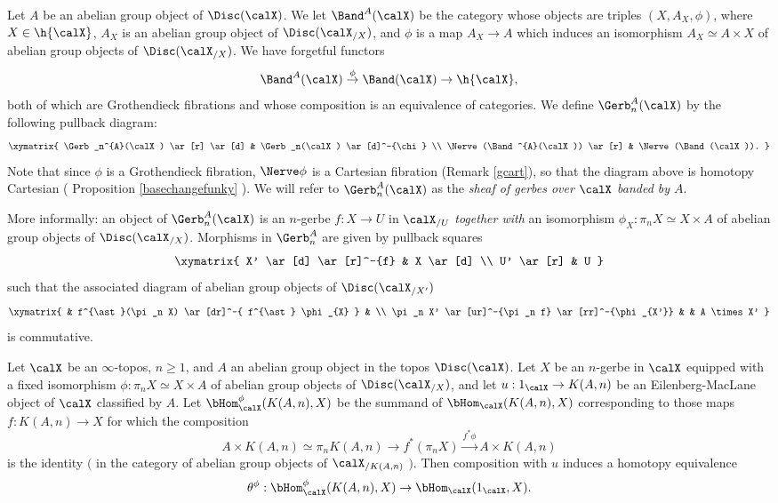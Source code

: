 \begin{notation}
Let $A$ be an abelian group object of $\Disc( \calX)$. We let $\Band^{A}(\calX)$
be the category whose objects are triples $(X, A_{X}, \phi)$, where $X \in \h{\calX}$,
$A_{X}$ is an abelian group object of $\Disc( \calX_{/X})$, and $\phi$ is a map
$A_{X} \rightarrow A$ which induces an isomorphism $A_{X} \simeq A \times X$ of abelian
group objects of $\Disc( \calX_{/X})$. We have forgetful functors
$$ \Band^{A}(\calX) \stackrel{\phi}{\rightarrow} \Band(\calX) \rightarrow \h{\calX},$$
both of which are Grothendieck fibrations and whose composition is an equivalence of categories.
We define $\Gerb^{A}_n(\calX)$ by the following pullback diagram:
$$ \xymatrix{ \Gerb_n^{A}(\calX) \ar[r] \ar[d] & \Gerb_n(\calX) \ar[d]^-{\chi} \\
\Nerve(\Band^{A}(\calX)) \ar[r] & \Nerve(\Band(\calX)). }$$
Note that since $\phi$ is a Grothendieck fibration, $\Nerve \phi$ is 
a Cartesian fibration (Remark \ref{gcart}), so that the diagram above is homotopy Cartesian
( Proposition \ref{basechangefunky} ). We will refer to $\Gerb_n^{A}(\calX)$ as the {\it sheaf of gerbes over $\calX$ banded by $A$}.
\end{notation}

More informally: an object of $\Gerb_n^{A}(\calX)$ is an $n$-gerbe $f: X \rightarrow U$
in $\calX_{/U}$ {\em together with} an isomorphism $\phi_{X}: \pi_{n} X \simeq X \times A$
of abelian group objects of $\Disc( \calX_{/X})$. Morphisms in $\Gerb_n^{A}$
are given by pullback squares
$$ \xymatrix{ X' \ar[d] \ar[r]^-{f} & X \ar[d] \\
U' \ar[r] & U }$$
such that the associated diagram of abelian group objects of $\Disc( \calX_{/X'})$
$$ \xymatrix{ & f^{\ast}(\pi_n X) \ar[dr]^-{ f^{\ast} \phi_{X} } & \\
\pi_n X' \ar[ur]^-{\pi_n f} \ar[rr]^-{\phi_{X'}} & & A \times X' }$$
is commutative.

\begin{lemma}\label{stareye}
Let $\calX$ be an $\infty$-topos, $n \geq 1$, and $A$ an abelian group object in the topos
$\Disc( \calX)$. Let $X$ be an $n$-gerbe in $\calX$ equipped with a fixed isomorphism
$\phi: \pi_n X \simeq X \times A$ of abelian group objects of $\Disc( \calX_{/X})$,
and let $u: 1_{\calX} \rightarrow K(A,n)$ be an Eilenberg-MacLane object of $\calX$ classified by $A$. Let $\bHom_{\calX}^{\phi}( K(A,n), X)$ be the summand of $\bHom_{\calX}( K(A,n), X)$
corresponding to those maps $f: K(A,n) \rightarrow X$ for which the composition
$$ A \times K(A,n) \simeq \pi_n K(A,n) \rightarrow f^{\ast}(\pi_n X) \stackrel{f^{\ast} \phi}{\rightarrow}
A \times K(A,n)$$
is the identity $($ in the category of abelian group objects of $\calX_{/K(A,n)}$ $)$. Then
composition with $u$ induces a homotopy equivalence
$$ \theta^{\phi}: \bHom_{\calX}^{\phi}( K(A,n), X) \rightarrow \bHom_{\calX}( 1_{\calX}, X).$$
\end{lemma}

